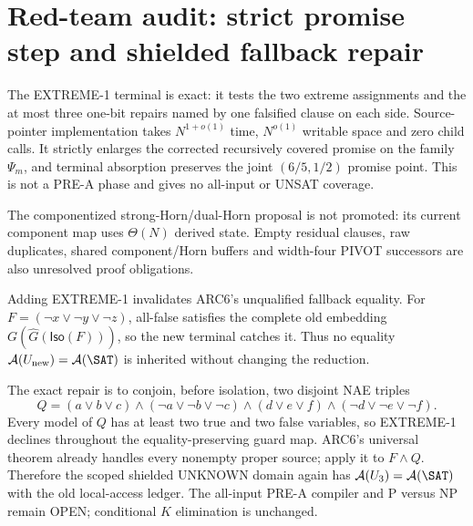 \section{Red-team audit: strict promise step and shielded fallback repair}

The \textsc{EXTREME-1} terminal is exact: it tests the two extreme
assignments and the at most three one-bit repairs named by one falsified
clause on each side.  Source-pointer implementation takes
$N^{1+o(1)}$ time, $N^{o(1)}$ writable space and zero child calls.  It
strictly enlarges the corrected recursively covered promise on the family
$\Psi_m$, and terminal absorption preserves the joint $(6/5,1/2)$ promise
point.  This is not a PRE-A phase and gives no all-input or UNSAT coverage.

The componentized strong-Horn/dual-Horn proposal is not promoted: its current
component map uses $\Theta(N)$ derived state.  Empty residual clauses, raw
duplicates, shared component/Horn buffers and width-four PIVOT successors are
also unresolved proof obligations.

Adding \textsc{EXTREME-1} invalidates ARC6's unqualified fallback equality.
For $F=(\neg x\vee\neg y\vee\neg z)$, all-false satisfies the complete old
embedding $G(\widehat G(\mathsf{Iso}(F)))$, so the new terminal catches it.
Thus no equality $\mathcal A(U_{\rm new})=\mathcal A(\SAT)$ is inherited
without changing the reduction.

The exact repair is to conjoin, before isolation, two disjoint NAE triples
\[
Q=(a\vee b\vee c)\wedge(\neg a\vee\neg b\vee\neg c)\wedge
(d\vee e\vee f)\wedge(\neg d\vee\neg e\vee\neg f).
\]
Every model of $Q$ has at least two true and two false variables, so
\textsc{EXTREME-1} declines throughout the equality-preserving guard map.
ARC6's universal theorem already handles every nonempty proper source; apply
it to $F\wedge Q$.  Therefore the scoped shielded UNKNOWN domain again has
$\mathcal A(U_3)=\mathcal A(\SAT)$ with the old local-access ledger.  The
all-input PRE-A compiler and P versus NP remain
OPEN; conditional $K$ elimination is unchanged.
